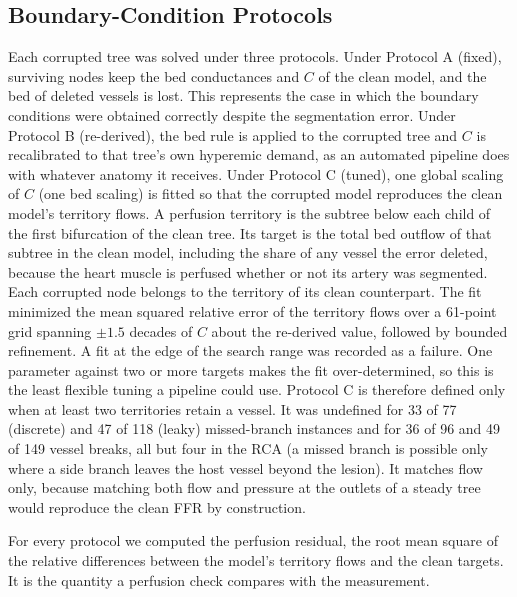 \documentclass[journal]{IEEEtran}
\begin{document}
\subsection{Boundary-Condition Protocols}
Each corrupted tree was solved under three protocols. Under Protocol A (fixed), surviving
nodes keep the bed conductances and $C$ of the clean model, and the bed of deleted vessels is lost. This represents
the case in which the boundary conditions were obtained correctly despite the segmentation error. Under Protocol B
(re-derived), the bed rule is applied to the corrupted tree and $C$ is recalibrated to that tree's own hyperemic
demand, as an automated pipeline does with whatever anatomy it receives. Under Protocol C (tuned), one global
scaling of $C$ (one bed scaling) is fitted so that the corrupted model reproduces the clean model's territory
flows. A perfusion territory is the subtree below each child of
the first bifurcation of the clean tree. Its target is the total bed outflow of that subtree in the clean model,
including the share of any vessel the error deleted, because the heart muscle is perfused whether or not its artery
was segmented. Each corrupted node belongs to the territory of its clean counterpart. The fit minimized the mean
squared relative error of the territory flows over a 61-point grid spanning $\pm 1.5$ decades of $C$ about the
re-derived value, followed by bounded refinement. A fit at the edge of the search range was recorded as a failure.
One parameter against two or more targets makes the fit over-determined, so this is the least flexible tuning a
pipeline could use. Protocol C is therefore defined only when at least two territories retain a vessel. It was undefined for 33 of
77 (discrete) and 47 of 118 (leaky) missed-branch instances and for 36 of 96 and 49 of 149 vessel breaks, all but
four in the RCA (a missed branch is possible only where a side branch leaves the host vessel beyond the lesion). It matches
flow only, because matching both flow and pressure at the outlets of a steady tree would reproduce the clean FFR by
construction.

For every protocol we computed the perfusion residual, the root mean square of the relative differences between the
model's territory flows and the clean targets. It is the quantity a perfusion check compares with the measurement.
\end{document}
